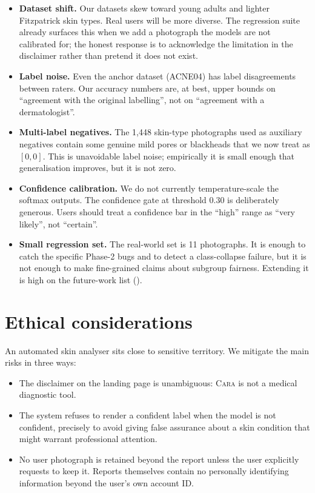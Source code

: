 \documentclass[11pt,a4paper,oneside]{report}
\newcommand{\cara}{\textsc{Cara}\xspace}
\begin{document}
\begin{itemize}
    \item \textbf{Dataset shift.} Our datasets skew toward young
        adults and lighter Fitzpatrick skin types. Real users
        will be more diverse. The regression suite already
        surfaces this when we add a photograph the models are
        not calibrated for; the honest response is to acknowledge
        the limitation in the disclaimer rather than pretend it
        does not exist.
    \item \textbf{Label noise.} Even the anchor dataset (ACNE04)
        has label disagreements between raters. Our accuracy
        numbers are, at best, upper bounds on ``agreement with
        the original labelling'', not on ``agreement with a
        dermatologist''.
    \item \textbf{Multi-label negatives.} The 1{,}448 skin-type
        photographs used as auxiliary negatives contain some
        genuine mild pores or blackheads that we now treat as
        \([0, 0]\). This is unavoidable label noise; empirically
        it is small enough that generalisation improves, but it
        is not zero.
    \item \textbf{Confidence calibration.} We do not currently
        temperature-scale the softmax outputs. The confidence
        gate at threshold \(0.30\) is deliberately generous.
        Users should treat a confidence bar in the ``high''
        range as ``very likely'', not ``certain''.
    \item \textbf{Small regression set.} The real-world set is
        11 photographs. It is enough to catch the specific
        Phase-2 bugs and to detect a class-collapse failure, but
        it is not enough to make fine-grained claims about
        subgroup fairness. Extending it is high on the
        future-work list ().
\end{itemize}

\section{Ethical considerations}

An automated skin analyser sits close to sensitive territory.
We mitigate the main risks in three ways:

\begin{itemize}
    \item The disclaimer on the landing page is unambiguous:
        \cara is not a medical diagnostic tool.
    \item The system refuses to render a confident label when the
        model is not confident, precisely to avoid giving false
        assurance about a skin condition that might warrant
        professional attention.
    \item No user photograph is retained beyond the report unless
        the user explicitly requests to keep it. Reports
        themselves contain no personally identifying information
        beyond the user's own account ID.
\end{itemize}
\end{document}
